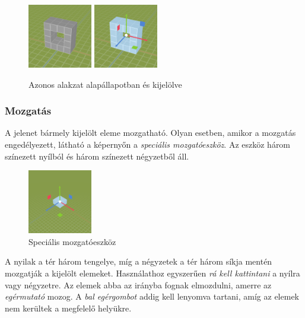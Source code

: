 \begin{figure}[H]
    \centering
    \includegraphics[width=0.25\textwidth]{parts/user-documentation/editor/images/unselected.png}
    \includegraphics[width=0.25\textwidth]{parts/user-documentation/editor/images/selected.png}
    \caption{Azonos alakzat alapállapotban és kijelölve}
\end{figure}

\subsubsection{Mozgatás}

A jelenet bármely kijelölt eleme mozgatható. Olyan esetben, amikor a mozgatás engedélyezett,
látható a képernyőn a \emph{speciális mozgatóeszköz}. Az eszköz három színezett nyílból és három
színezett négyzetből áll.

\begin{figure}[H]
    \centering
    \includegraphics[width=0.25\textwidth]{parts/user-documentation/editor/images/move_gizmo.png}
    \caption{Speciális mozgatóeszköz}
\end{figure}

A nyilak a tér három tengelye, míg a négyzetek a tér három síkja mentén
mozgatják a kijelölt elemeket. Használathoz egyszerűen \emph{rá kell kattintani} a nyílra vagy
négyzetre. Az elemek abba az irányba fognak elmozdulni, amerre az \emph{egérmutató} mozog. A
\emph{bal egérgombot} addig kell lenyomva tartani, amíg az elemek nem kerültek a megfelelő helyükre.

